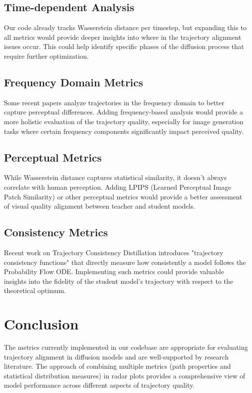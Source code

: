 \documentclass{article}
\begin{document}
\subsection{Time-dependent Analysis}
Our code already tracks Wasserstein distance per timestep, but expanding this to all metrics would provide deeper insights into where in the trajectory alignment issues occur. This could help identify specific phases of the diffusion process that require further optimization.

\subsection{Frequency Domain Metrics}
Some recent papers analyze trajectories in the frequency domain to better capture perceptual differences. Adding frequency-based analysis would provide a more holistic evaluation of the trajectory quality, especially for image generation tasks where certain frequency components significantly impact perceived quality.

\subsection{Perceptual Metrics}
While Wasserstein distance captures statistical similarity, it doesn't always correlate with human perception. Adding LPIPS (Learned Perceptual Image Patch Similarity) or other perceptual metrics would provide a better assessment of visual quality alignment between teacher and student models.

\subsection{Consistency Metrics}
Recent work on Trajectory Consistency Distillation \cite{zheng2024trajectory} introduces "trajectory consistency functions" that directly measure how consistently a model follows the Probability Flow ODE. Implementing such metrics could provide valuable insights into the fidelity of the student model's trajectory with respect to the theoretical optimum.

\section{Conclusion}
The metrics currently implemented in our codebase are appropriate for evaluating trajectory alignment in diffusion models and are well-supported by research literature. The approach of combining multiple metrics (path properties and statistical distribution measures) in radar plots provides a comprehensive view of model performance across different aspects of trajectory quality.
\end{document}
